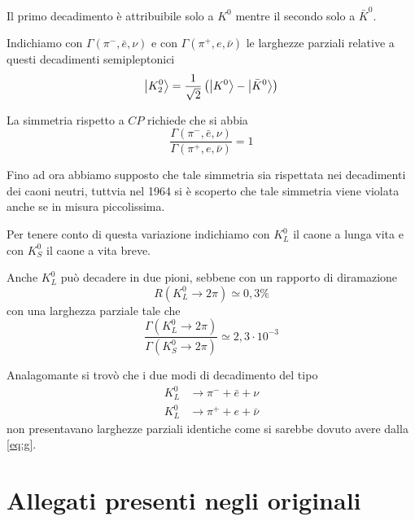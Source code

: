 Il primo decadimento è attribuibile solo a $K^0$ mentre il secondo solo a
$\bar{K}^0$.

Indichiamo con $\Gamma(\pi^-, \bar{e}, \nu)$ e con $\Gamma(\pi^+, e, \bar{\nu})$
le larghezze parziali relative a questi decadimenti semipleptonici
\[
  \Ket{K_2^0} = \frac{1}{\sqrt{2}}\left( \Ket{K^0} - \Ket{\bar{K}^0}\right)
\]

La simmetria rispetto a $CP$ richiede che si abbia
\begin{equation}
  \frac{\Gamma(\pi^-,\bar{e},\nu)}{\Gamma(\pi^+,e,\bar{\nu})}=1
  \label{eq:g}
\end{equation}

Fino ad ora abbiamo supposto che tale simmetria sia rispettata nei decadimenti
dei caoni neutri, tuttvia nel 1964 si è scoperto che tale simmetria viene
violata anche se in misura piccolissima.

Per tenere conto di questa variazione indichiamo con $K_L^0$ il caone a lunga
vita e con $K_S^0$ il caone a vita breve.

Anche $K_L^0$ può decadere in due pioni, sebbene con un rapporto di diramazione
\[
  R(K_L^0\rightarrow 2\pi)\simeq 0,3\%
\]
con una larghezza parziale tale che
\[
  \frac{\Gamma(K_L^0\rightarrow 2\pi)}{\Gamma(K_S^0\rightarrow 2\pi)}\simeq
  2,3\cdot10^{-3}
\]

Analagomante si trovò che i due modi di decadimento del tipo
\[
  \begin{split}
	K^0_L &\rightarrow \pi^- + \bar{e} + \nu\\
	K^0_L &\rightarrow \pi^+ + e + \bar{\nu}
  \end{split}
\]
non presentavano larghezze parziali identiche come si sarebbe dovuto avere dalla
\eqref{eq:g}.

\chapter{Allegati presenti negli originali}








